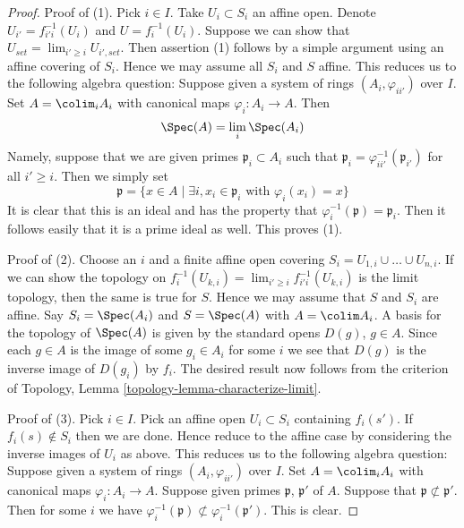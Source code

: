 \begin{proof}
Proof of (1). Pick $i \in I$. Take $U_i \subset S_i$ an affine open.
Denote $U_{i'} = f_{i'i}^{-1}(U_i)$ and $U = f_i^{-1}(U_i)$.
Suppose we can show that $U_{set} = \lim_{i' \geq i} U_{i', set}$. Then
assertion (1) follows by a simple argument using an affine covering of $S_i$.
Hence we may assume all $S_i$ and $S$ affine. This reduces us to the following
algebra question: Suppose given a system of rings $(A_i, \varphi_{ii'})$
over $I$. Set $A = \colim_i A_i$ with canonical maps $\varphi_i : A_i \to A$.
Then
$$
\Spec(A) = \lim_i \Spec(A_i)
$$
Namely, suppose that we are given primes $\mathfrak p_i \subset A_i$
such that $\mathfrak p_i = \varphi_{ii'}^{-1}(\mathfrak p_{i'})$
for all $i' \geq i$. Then we simply set
$$
\mathfrak p =
\{x \in A
\mid
\exists i, x_i \in \mathfrak p_i \text{ with }\varphi_i(x_i) = x\}
$$
It is clear that this is an ideal and has the property that
$\varphi_i^{-1}(\mathfrak p) = \mathfrak p_i$. Then it follows
easily that it is a prime ideal as well. This proves (1).

\medskip\noindent
Proof of (2).
Choose an $i$ and a finite affine open covering
$S_i = U_{1, i} \cup \ldots \cup U_{n, i}$.
If we can show the topology on
$f_i^{-1}(U_{k, i}) = \lim_{i' \geq i} f_{i'i}^{-1}(U_{k, i})$
is the limit topology, then the same is true for $S$.
Hence we may assume that $S$ and $S_i$ are affine.
Say $S_i = \Spec(A_i)$ and $S = \Spec(A)$ with $A = \colim A_i$.
A basis for the topology of $\Spec(A)$ is given by the
standard opens $D(g)$, $g \in A$. Since each $g \in A$ is
the image of some $g_i \in A_i$ for some $i$ we see that
$D(g)$ is the inverse image of $D(g_i)$ by $f_i$. The
desired result now follows from the criterion of
Topology, Lemma \ref{topology-lemma-characterize-limit}.

\medskip\noindent
Proof of (3). Pick $i \in I$. Pick an affine open $U_i \subset S_i$
containing $f_i(s')$. If $f_i(s) \not \in S_i$ then we
are done. Hence reduce to the affine case by considering the inverse
images of $U_i$ as above.
This reduces us to the following algebra question:
Suppose given a system of rings $(A_i, \varphi_{ii'})$ over $I$. Set
$A = \colim_i A_i$ with canonical maps $\varphi_i : A_i \to A$.
Suppose given primes $\mathfrak p$, $\mathfrak p'$ of $A$.
Suppose that $\mathfrak p \not \subset \mathfrak p'$.
Then for some $i$ we have
$\varphi_i^{-1}(\mathfrak p) \not \subset \varphi_i^{-1}(\mathfrak p')$.
This is clear.
\end{proof}

